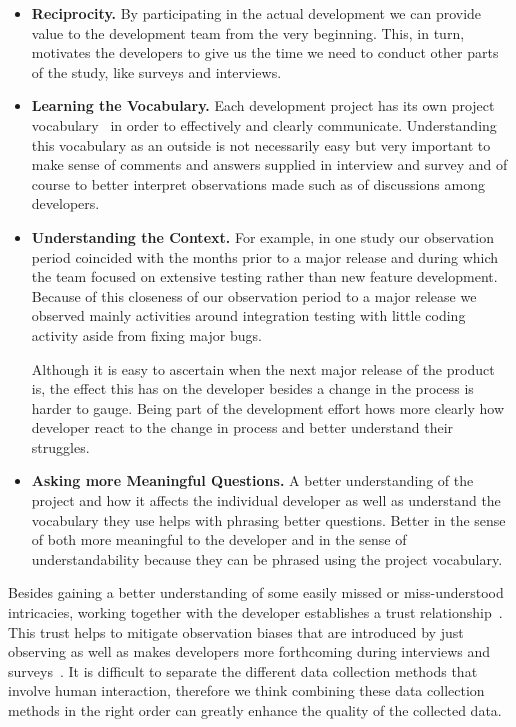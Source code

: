 \begin{itemize}
\item\textbf{Reciprocity.} By participating in the actual development we can provide value to the development team from the very beginning.
This, in turn, motivates the developers to give us the time we need to conduct other parts of the study, like surveys and interviews.
\item\textbf{Learning the Vocabulary.} Each development project has its own project vocabulary~\cite{espinosa2007:team_knowledge} in order to effectively and clearly communicate. 
Understanding this vocabulary as an outside is not necessarily easy but very important to make sense of comments and answers supplied in interview and survey and of course to better interpret observations made such as of discussions among developers.
\item\textbf{Understanding the Context.} For example, in one study our observation period coincided with the months prior to a major release and during which the team focused on extensive testing rather than new feature development. 
Because of this closeness of our observation period to a major release we observed mainly activities around integration testing with little coding activity aside from fixing major bugs.

Although it is easy to ascertain when the next major release of the product is, the effect this has on the developer besides a change in the process is harder to gauge.
Being part of the development effort hows more clearly how developer react to the change in process and better understand their struggles.

\item\textbf{Asking more Meaningful Questions.} A better understanding of the project and how it affects the individual developer as well as understand the vocabulary they use helps with phrasing better questions.
Better in the sense of both more meaningful to the developer and in the sense of understandability because they can be phrased using the project vocabulary.
\end{itemize}

Besides gaining a better understanding of some easily missed or miss-understood intricacies, working together with the developer establishes a trust relationship~\cite{letherbridge:ese2005}.
This trust helps to mitigate observation biases that are introduced by just observing as well as makes developers more forthcoming during interviews and surveys~\cite{letherbridge:ese2005}.
It is difficult to separate the different data collection methods that involve human interaction, therefore we think combining these data collection methods in the right order can greatly enhance the quality of the collected data.


